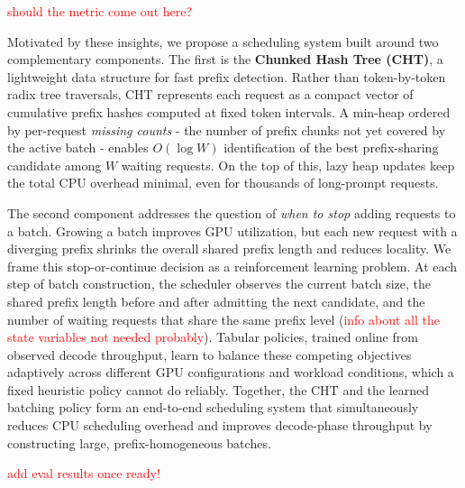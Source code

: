\textcolor{red}{should the metric come out here?}

Motivated by these insights, we propose a scheduling system built around two complementary components. The first is the \textbf{Chunked Hash Tree (CHT)}, a lightweight data structure for fast prefix detection. Rather than token-by-token radix tree traversals, CHT represents each request as a compact vector of cumulative prefix hashes computed at fixed token intervals. A min-heap ordered by per-request \emph{missing counts} - the number of prefix chunks not yet covered by the active batch - enables $O(\log W)$ identification of the best prefix-sharing candidate among $W$ waiting requests. On the top of this, lazy heap updates keep the total CPU overhead minimal, even for thousands of long-prompt requests.

The second component addresses the question of \emph{when to stop} adding requests to a batch. Growing a batch improves GPU utilization, but each new request with a diverging prefix shrinks the overall shared prefix length and reduces locality. We frame this stop-or-continue decision as a reinforcement learning problem. At each step of batch construction, the scheduler observes the current batch size, the shared prefix length before and after admitting the next candidate, and the number of waiting requests that share the same prefix level (\textcolor{red}{info about all the state variables not needed probably}). Tabular policies, trained online from observed decode throughput, learn to balance these competing objectives adaptively across different GPU configurations and workload conditions, which a fixed heuristic policy cannot do reliably. Together, the CHT and the learned batching policy form an end-to-end scheduling system that simultaneously reduces CPU scheduling overhead and improves decode-phase throughput by constructing large, prefix-homogeneous batches. 

\textcolor{red}{add eval results once ready!}

